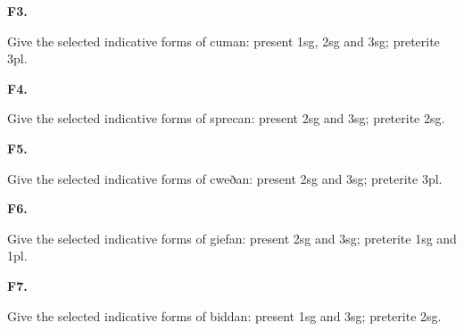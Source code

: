 \par\begin{minipage}{\linewidth}\raggedright
\textbf{F3.}

Give the selected indicative forms of cuman: present 1sg, 2sg and 3sg; preterite 3pl.

\end{minipage}\par\addvspace{4pt}

\par\begin{minipage}{\linewidth}\raggedright
\textbf{F4.}

Give the selected indicative forms of sprecan: present 2sg and 3sg; preterite 2sg.

\end{minipage}\par\addvspace{4pt}

\par\begin{minipage}{\linewidth}\raggedright
\textbf{F5.}

Give the selected indicative forms of cweðan: present 2sg and 3sg; preterite 3pl.

\end{minipage}\par\addvspace{4pt}

\par\begin{minipage}{\linewidth}\raggedright
\textbf{F6.}

Give the selected indicative forms of giefan: present 2sg and 3sg; preterite 1sg and 1pl.

\end{minipage}\par\addvspace{4pt}

\par\begin{minipage}{\linewidth}\raggedright
\textbf{F7.}

Give the selected indicative forms of biddan: present 1sg and 3sg; preterite 2sg.

\end{minipage}\par\addvspace{4pt}

